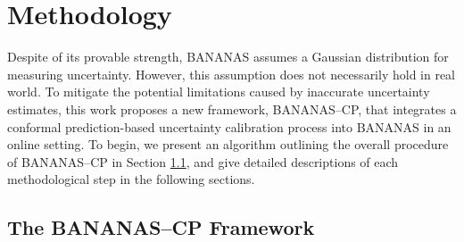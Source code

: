 \chapter{Methodology}
\label{ch3}
Despite of its provable strength, BANANAS assumes a Gaussian distribution for measuring uncertainty. However, this assumption does not necessarily hold in real world. To mitigate the potential limitations caused by inaccurate uncertainty estimates, this work proposes a new framework, BANANAS--CP, that integrates a conformal prediction-based uncertainty calibration process into BANANAS in an online setting. To begin, we present an algorithm outlining the overall procedure of BANANAS--CP in Section \ref{sec:overview}, and give detailed descriptions of each methodological step in the following sections. 

\section{The BANANAS--CP Framework}
\label{sec:overview}
